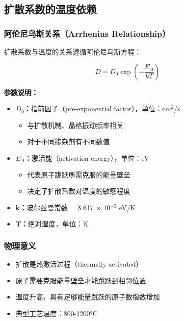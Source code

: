 \documentclass[UTF8,12pt,a4paper]{ctexart}
\begin{document}
\subsection{扩散系数的温度依赖}

\subsubsection{阿伦尼乌斯关系（Arrhenius Relationship）}

扩散系数与温度的关系遵循阿伦尼乌斯方程：

\begin{equation}
D = D_0 \exp\left(-\frac{E_A}{kT}\right)
\end{equation}

\textbf{参数说明：}
\begin{itemize}
    \item \textbf{$D_0$：}指前因子（pre-exponential factor），单位：cm$^2$/s
    \begin{itemize}
        \item 与扩散机制、晶格振动频率相关
        \item 对于不同掺杂剂有不同数值
    \end{itemize}
    \item \textbf{$E_A$：}激活能（activation energy），单位：eV
    \begin{itemize}
        \item 代表原子跳跃所需克服的能量壁垒
        \item 决定了扩散系数对温度的敏感程度
    \end{itemize}
    \item \textbf{k：}玻尔兹曼常数 = 8.617 $\times$ 10$^{-5}$ eV/K
    \item \textbf{T：}绝对温度，单位：K
\end{itemize}

\subsubsection{物理意义}

\begin{itemize}
    \item 扩散是热激活过程（thermally activated）
    \item 原子需要克服能量壁垒才能跳跃到相邻位置
    \item 温度升高，具有足够能量跳跃的原子数指数增加
    \item 典型工艺温度：800-1200°C
\end{itemize}
\end{document}
